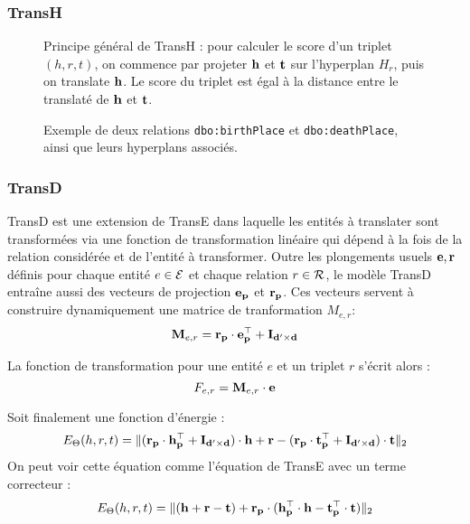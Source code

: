 \subsubsection{TransH \cite{fu2014learning}}

\begin{figure}[hbt]
    \centering
    
    \caption[Principe général de TransH]{Principe général de TransH : pour calculer le score d'un triplet $(h, r, t)$, on commence par projeter $\bf{h}$ et $\bf{t}$ sur l'hyperplan $H_r$, puis on translate $\bf{h}$. Le score du triplet est égal à la distance entre le translaté de $\bf{h}$ et $\bf{t}$.}
    \label{fig:transh}
\end{figure}

\begin{figure}[hbt]
    \centering
    
    \caption[Exemple des possibilités laissées par TransH]{Exemple de deux relations \texttt{dbo:birthPlace} et \texttt{dbo:deathPlace}, ainsi que leurs hyperplans associés.}
    \label{fig:transh-dual}
\end{figure}

\subsubsection{TransD}

TransD est une extension de TransE dans laquelle les entités à translater sont transformées via une fonction de transformation linéaire qui dépend à la fois de la relation considérée et de l'entité à transformer. Outre les plongements usuels $\bf{e}, \bf{r}$ définis pour chaque entité $e \in \Ent $ et chaque relation $r \in \Rel$, le modèle TransD entraîne aussi des vecteurs de projection $\bf{e_p}$ et $\bf{r_p}$. Ces vecteurs servent à construire dynamiquement une matrice de tranformation $M_{e, r}$:
\begin{equation}
    \label{eq:kge-transd-matrix}
    \bf{M}_{e, r} = \bf{r_p \cdot e_p^\top + I_{d' \times d}}
\end{equation}

La fonction de transformation pour une entité $e$ et un triplet $r$ s'écrit alors :
\begin{equation}
    \label{eq:kge-transd-function}
    F_{e, r} = \bf{M}_{e, r} \cdot \bf{e}
\end{equation}

Soit finalement une fonction d'énergie :
\begin{equation}
    E_\Theta(h, r, t) = \| (\bf{r_p \cdot h_p^\top + I_{d' \times d}}) \cdot \bf{h} + \mathbf{r} - (\bf{r_p \cdot t_p^\top + I_{d' \times d}}) \cdot \bf{t} \|_2 
\end{equation}
On peut voir cette équation comme l'équation de TransE avec un terme correcteur :
\begin{equation}
    E_\Theta(h, r, t) = \| (\bf{h + r - t}) + \bf{r_p} \cdot (\bf{ h_p^\top \cdot h - t_p^\top \cdot t}) \|_2 
\end{equation}



